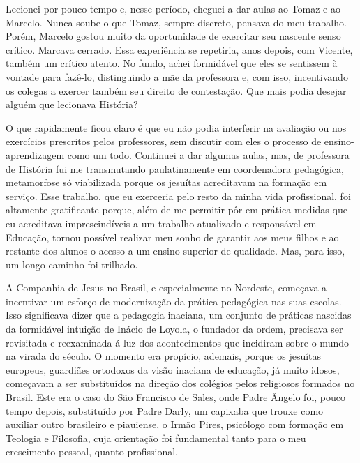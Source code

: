 Lecionei por pouco tempo e, nesse período, cheguei a dar aulas ao Tomaz e ao Marcelo.
Nunca soube o que Tomaz, sempre discreto, pensava do meu trabalho.
Porém, Marcelo gostou muito da oportunidade de exercitar seu nascente senso crítico.
Marcava cerrado.
Essa experiência se repetiria, anos depois, com Vicente, também um crítico atento.
No fundo, achei formidável que eles se sentissem à vontade para fazê-lo, distinguindo a mãe da professora e, com isso, incentivando os colegas a exercer também seu direito de contestação.
Que mais podia desejar alguém que lecionava História? 

O que rapidamente ficou claro é que eu não podia interferir na avaliação ou nos exercícios prescritos pelos professores, sem discutir com eles o processo de ensino-aprendizagem como um todo.
Continuei a dar algumas aulas, mas, de professora de História fui me transmutando paulatinamente em coordenadora pedagógica, metamorfose só viabilizada porque os jesuítas acreditavam na formação em serviço.
Esse trabalho, que eu exerceria pelo resto da minha vida profissional, foi altamente gratificante porque, além de me permitir pôr em prática medidas que eu acreditava imprescindíveis a um trabalho atualizado e responsável em Educação, tornou possível realizar meu sonho de garantir aos meus filhos e ao restante dos alunos o acesso a um ensino superior de qualidade.
Mas, para isso, um longo caminho foi trilhado.

A Companhia de Jesus no Brasil, e especialmente no Nordeste, começava a incentivar um esforço de modernização da prática pedagógica nas suas escolas.
Isso significava dizer que a pedagogia inaciana, um conjunto de práticas nascidas da formidável intuição de Inácio de Loyola, o fundador da ordem, precisava ser revisitada e reexaminada á luz dos acontecimentos que incidiram sobre o mundo na virada do século.
O momento era propício, ademais, porque os jesuítas europeus, guardiães ortodoxos da visão inaciana de educação, já muito idosos, começavam a ser substituídos na direção dos colégios pelos religiosos formados no Brasil.
Este era o caso do São Francisco de Sales, onde Padre Ângelo foi, pouco tempo depois, substituído por Padre Darly, um capixaba que trouxe como auxiliar outro brasileiro e piauiense, o Irmão Pires, psicólogo com formação em Teologia e Filosofia, cuja orientação foi fundamental tanto para o meu crescimento pessoal, quanto profissional.
 

